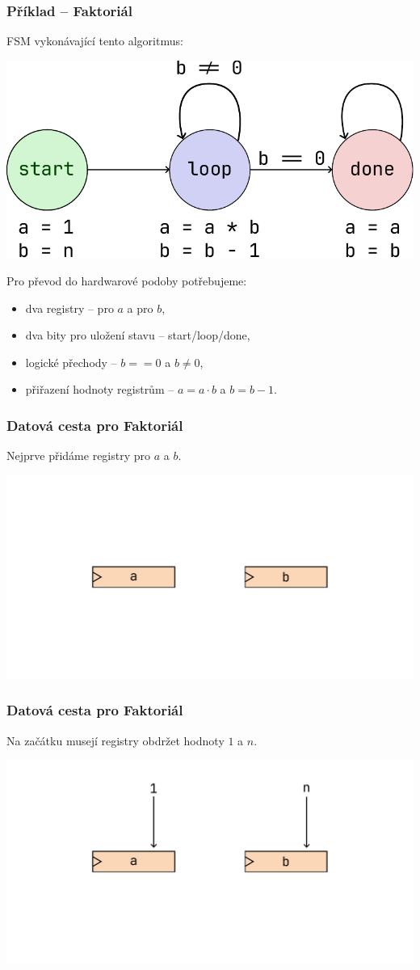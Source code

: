 \documentclass[aspectratio=169,11pt,svgnames,handout]{beamer}
\begin{document}
\begin{frame}
 \frametitle{Příklad -- Faktoriál}
 FSM vykonávající tento algoritmus:
 \vspace*{-\parskip}
 \begin{center}
  \includegraphics[width=.4\textwidth]{factorial.pdf}
 \end{center}
 \vspace*{-\parskip}
 \pause
 Pro převod do hardwarové podoby potřebujeme:
 \pause
 \begin{itemize}[label=\textbullet,topsep=0pt]
  \item dva registry -- pro $a$ a pro $b$,
  \pause
  \item dva bity pro uložení stavu -- start/loop/done,
  \pause
  \item logické přechody -- $b == 0$ a $b \neq 0$,
  \pause
  \item přiřazení hodnoty registrům -- $a = a \cdot b$ a $b = b - 1$.
 \end{itemize}
\end{frame}

\begin{frame}
 \frametitle{Datová cesta pro Faktoriál}
 Nejprve přidáme registry pro $a$ a $b$.
 \begin{center}
  \includegraphics[width=.75\textwidth]{factorial-circuit-1.pdf}
 \end{center}
\end{frame}

\begin{frame}
 \frametitle{Datová cesta pro Faktoriál}
 Na začátku musejí registry obdržet hodnoty $1$ a $n$.
 \begin{center}
  \includegraphics[width=.75\textwidth]{factorial-circuit-2.pdf}
 \end{center}
\end{frame}
\end{document}
